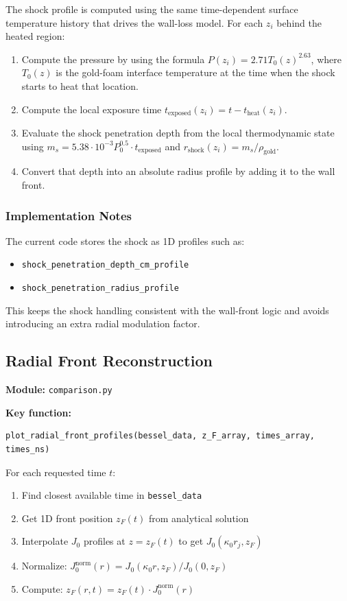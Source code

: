 \documentclass[12pt,a4paper]{article}
\begin{document}
The shock profile is computed using the same time-dependent surface temperature history that drives the wall-loss model. For each $z_i$ behind the heated region:
\begin{enumerate}
    \item Compute the pressure by using the formula $P(z_i) = 2.71 T_0(z) ^ {2.63}$, where $T_0(z)$ is the gold-foam interface temperature at the time when the shock starts to heat that location.
    \item Compute the local exposure time $t_{\text{exposed}}(z_i) = t - t_{\text{heat}}(z_i)$.
    \item Evaluate the shock penetration depth from the local thermodynamic state using $m_s = 5.38\cdot10^{-3} P_0 ^ {0.5} \cdot t_{\text{exposed}}$ and $r_{\text{shock}}(z_i) = m_s / \rho_{\text{gold}}$.
    \item Convert that depth into an absolute radius profile by adding it to the wall front.
\end{enumerate}

\subsubsection*{Implementation Notes}

The current code stores the shock as 1D profiles such as:
\begin{itemize}
    \item \texttt{shock\_penetration\_depth\_cm\_profile}
    \item \texttt{shock\_penetration\_radius\_profile}
\end{itemize}

This keeps the shock handling consistent with the wall-front logic and avoids introducing an extra radial modulation factor.

\subsection{Radial Front Reconstruction}

\textbf{Module:} \texttt{comparison.py}

\textbf{Key function:}
\begin{verbatim}
plot_radial_front_profiles(bessel_data, z_F_array, times_array, times_ns)
\end{verbatim}

For each requested time $t$:
\begin{enumerate}
    \item Find closest available time in \texttt{bessel\_data}
    \item Get 1D front position $z_F(t)$ from analytical solution
    \item Interpolate $J_0$ profiles at $z = z_F(t)$ to get $J_0(\kappa_0 r_j, z_F)$
    \item Normalize: $J_0^{\text{norm}}(r) = J_0(\kappa_0 r, z_F) / J_0(0, z_F)$
    \item Compute: $z_F(r,t) = z_F(t) \cdot J_0^{\text{norm}}(r)$
\end{enumerate}
\end{document}

